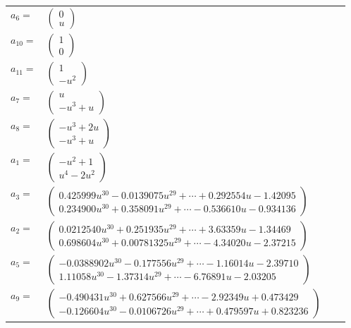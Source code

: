 \documentclass[1p]{elsarticle_modified}
\theoremstyle{definition}
\begin{document}
\begin{tabular}{m{7pt} m{180pt} m{7pt} m{180pt} }
\flushright $a_{6}=$&$\begin{pmatrix}0\\u\end{pmatrix}$ \\
\flushright $a_{10}=$&$\begin{pmatrix}1\\0\end{pmatrix}$ \\
\flushright $a_{11}=$&$\begin{pmatrix}1\\- u^2\end{pmatrix}$ \\
\flushright $a_{7}=$&$\begin{pmatrix}u\\- u^3+u\end{pmatrix}$ \\
\flushright $a_{8}=$&$\begin{pmatrix}- u^3+2 u\\- u^3+u\end{pmatrix}$ \\
\flushright $a_{1}=$&$\begin{pmatrix}- u^2+1\\u^4-2 u^2\end{pmatrix}$ \\
\flushright $a_{3}=$&$\begin{pmatrix}0.425999 u^{30}-0.0139075 u^{29}+\cdots+0.292554 u-1.42095\\0.234900 u^{30}+0.358091 u^{29}+\cdots-0.536610 u-0.934136\end{pmatrix}$ \\
\flushright $a_{2}=$&$\begin{pmatrix}0.0212540 u^{30}+0.251935 u^{29}+\cdots+3.63359 u-1.34469\\0.698604 u^{30}+0.00781325 u^{29}+\cdots-4.34020 u-2.37215\end{pmatrix}$ \\
\flushright $a_{5}=$&$\begin{pmatrix}-0.0388902 u^{30}-0.177556 u^{29}+\cdots-1.16014 u-2.39710\\1.11058 u^{30}-1.37314 u^{29}+\cdots-6.76891 u-2.03205\end{pmatrix}$ \\
\flushright $a_{9}=$&$\begin{pmatrix}-0.490431 u^{30}+0.627566 u^{29}+\cdots-2.92349 u+0.473429\\-0.126604 u^{30}-0.0106726 u^{29}+\cdots+0.479597 u+0.823236\end{pmatrix}$ \\

\end{tabular}
\end{document}

